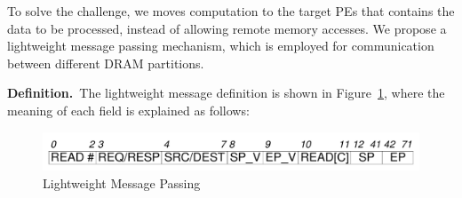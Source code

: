 \documentclass[9pt,conference]{IEEEtran}
\begin{document}
To solve the challenge, we moves computation to the target PEs that contains the data to be processed, instead of allowing remote memory accesses. We propose a lightweight message passing mechanism, which is employed for communication between different DRAM partitions.

\textbf{Definition.}~The lightweight message definition is shown in Figure~\ref{fig:message}, where the meaning of each field is explained as follows:

\begin{figure}[htbp]
    \centering
    \includegraphics[width=\linewidth]{fig/Bits.pdf}
    \caption{Lightweight Message Passing}
    \label{fig:message}
\end{figure}
\end{document}
